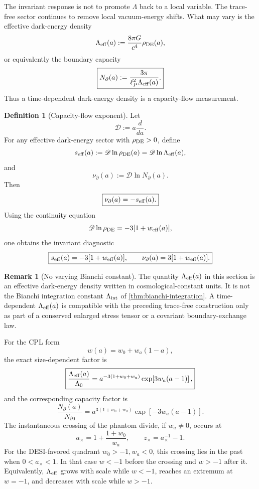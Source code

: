 \documentclass[aps,prd,reprint,nofootinbib,superscriptaddress]{revtex4-2}
\numberwithin{equation}{section}
\theoremstyle{definition}
\newtheorem{definition}{Definition}[section]
\newtheorem{remark}{Remark}[section]
\theoremstyle{plain}
\newcommand{\Dil}{\mathscr D}
\begin{document}
The invariant response is not to promote \(\Lambda\) back to a local variable.  The trace-free sector continues to remove local vacuum-energy shifts.  What may vary is the effective dark-energy density
\[
\Lambda_{\rm eff}(a):=\frac{8\pi G}{c^4}\rho_{\rm DE}(a),
\]
or equivalently the boundary capacity
\[
\boxed{
N_\partial(a):=\frac{3\pi}{\ell_P^2\Lambda_{\rm eff}(a)}.
}
\]
Thus a time-dependent dark-energy density is a capacity-flow measurement.

\begin{definition}[Capacity-flow exponent]
Let
\[
\Dil:=a\frac{d}{da}.
\]
For any effective dark-energy sector with \(\rho_{\rm DE}>0\), define
\[
s_{\rm eff}(a):=\Dil\ln\rho_{\rm DE}(a)
=\Dil\ln\Lambda_{\rm eff}(a),
\]
and
\[
\nu_\partial(a):=\Dil\ln N_\partial(a).
\]
Then
\[
\boxed{
\nu_\partial(a)=-s_{\rm eff}(a).
}
\]
Using the continuity equation
\[
\Dil\ln\rho_{\rm DE}=-3[1+w_{\rm eff}(a)],
\]
one obtains the invariant diagnostic
\[
\boxed{
s_{\rm eff}(a)=-3[1+w_{\rm eff}(a)],
\qquad
\nu_\partial(a)=3[1+w_{\rm eff}(a)].
}
\]
\end{definition}

\begin{remark}[No varying Bianchi constant]
The quantity \(\Lambda_{\rm eff}(a)\) in this section is an effective dark-energy density written in cosmological-constant units.  It is not the Bianchi integration constant \(\Lambda_{\rm int}\) of \cref{thm:bianchi-integration}.  A time-dependent \(\Lambda_{\rm eff}(a)\) is compatible with the preceding trace-free construction only as part of a conserved enlarged stress tensor or a covariant boundary-exchange law.
\end{remark}

For the CPL form
\[
w(a)=w_0+w_a(1-a),
\]
the exact size-dependent factor is
\[
\boxed{
\frac{\Lambda_{\rm eff}(a)}{\Lambda_0}
=
a^{-3(1+w_0+w_a)}
\exp\!\left[3w_a(a-1)\right],
}
\]
and the corresponding capacity factor is
\[
\boxed{
\frac{N_\partial(a)}{N_{\partial0}}
=
a^{3(1+w_0+w_a)}
\exp\!\left[-3w_a(a-1)\right].
}
\]
The instantaneous crossing of the phantom divide, if \(w_a\ne0\), occurs at
\[
\boxed{
a_\times=1+\frac{1+w_0}{w_a},
\qquad
z_\times=a_\times^{-1}-1.
}
\]
For the DESI-favored quadrant \(w_0>-1,w_a<0\), this crossing lies in the past when \(0<a_\times<1\).  In that case \(w<-1\) before the crossing and \(w>-1\) after it.  Equivalently, \(\Lambda_{\rm eff}\) grows with scale while \(w<-1\), reaches an extremum at \(w=-1\), and decreases with scale while \(w>-1\).
\end{document}
